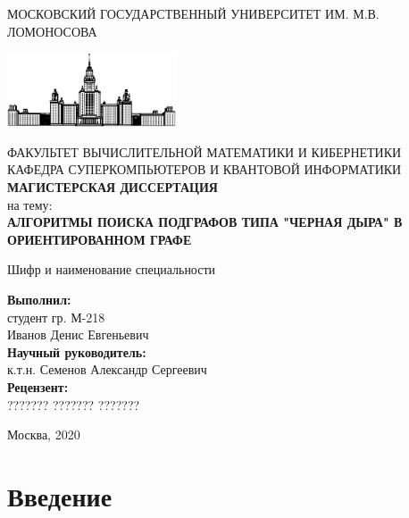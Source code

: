 \documentclass[12pt,a4paper,oneside]{article}
\begin{document}
\begin{titlepage}
        \begin{center}

        \bigskip

        \uppercase{Московский государственный университет им. М.В. Ломоносова} \\

        \bigskip

        \includegraphics[width=50mm]{msu.eps}

        \bigskip
        \uppercase{Факультет вычислительной математики и кибернетики} \\
        \uppercase{Кафедра суперкомпьютеров и квантовой информатики} \\
        \bigskip
        \uppercase{\Huge\bfseries Магистерская диссертация} \\
        {\large на тему:} \\
        \uppercase{\large\bfseries Алгоритмы поиска подграфов типа "черная дыра" в ориентированном графе}

        \bigskip
        Шифр и наименование специальности

    \end{center}

    \bigskip
    \begin{flushright}
        \begin{minipage}{7cm}
            {\bfseries Выполнил:} \\
            студент гр. М-218 \\
            Иванов Денис Евгеньевич \\

            {\bfseries Научный руководитель:} \\
            к.т.н. Семенов Александр Сергеевич \\

            {\bfseries Рецензент:} \\
            ??????? ??????? ???????
        \end{minipage}
    \end{flushright}

    \vfill

    \begin{center}
    {\large Москва, 2020}
    \end{center}

\end{titlepage}

\tableofcontents

\cleardoublepage

\section{Введение}\label{sec:otherintro}
\end{document}
